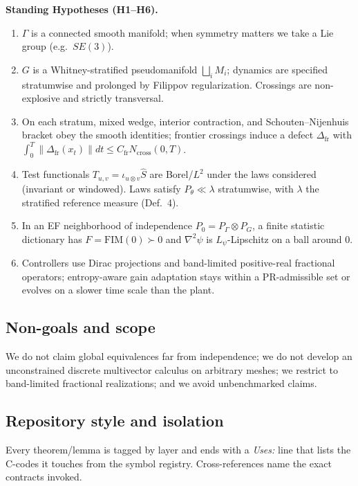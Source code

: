 \documentclass[10pt]{article}
\newcommand{\FIM}{\mathrm{FIM}}
\begin{document}
\begin{mdframed}
\textbf{Standing Hypotheses (H1--H6).}
\begin{enumerate}[label=(H\arabic*),leftmargin=*]
\item $\Gamma$ is a connected smooth manifold; when symmetry matters we take a Lie group (e.g.\ $SE(3)$).
\item $G$ is a Whitney-stratified pseudomanifold $\bigsqcup_i M_i$; dynamics are specified stratumwise and prolonged by Filippov regularization. Crossings are non-explosive and strictly transversal.
\item On each stratum, mixed wedge, interior contraction, and Schouten–Nijenhuis bracket obey the smooth identities; frontier crossings induce a defect $\Delta_{\mathrm{fr}}$ with $\int_0^T\|\Delta_{\mathrm{fr}}(x_t)\|dt\le C_{\mathrm{fr}} N_{\mathrm{cross}}(0,T)$.
\item Test functionals $T_{u,v}=\iota_{u\otimes v}\hat S$ are Borel/$L^2$ under the laws considered (invariant or windowed). Laws satisfy $P_\theta\ll\lambda$ stratumwise, with $\lambda$ the stratified reference measure (Def.~4).
\item In an EF neighborhood of independence $P_0=P_\Gamma\otimes P_G$, a finite statistic dictionary has $F=\FIM(0)\succ0$ and $\nabla^2\psi$ is $L_\psi$-Lipschitz on a ball around $0$.
\item Controllers use Dirac projections and band-limited positive-real fractional operators; entropy-aware gain adaptation stays within a PR-admissible set or evolves on a slower time scale than the plant.
\end{enumerate}
\end{mdframed}

\subsection*{Non-goals and scope}
We do not claim global equivalences far from independence; we do not develop an unconstrained discrete multivector calculus on arbitrary meshes; we restrict to band-limited fractional realizations; and we avoid unbenchmarked claims.

\subsection*{Repository style and isolation}
Every theorem/lemma is tagged by layer and ends with a \emph{Uses:} line that lists the C-codes it touches from the symbol registry. Cross-references name the exact contracts invoked.
\end{document}
